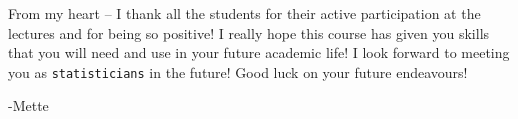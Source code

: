 \documentclass[ignorenonframetext,]{beamer}
\begin{document}
\begin{frame}[fragile]

From my heart -- I thank all the students for their active participation
at the lectures and for being so positive! I really hope this course has
given you skills that you will need and use in your future academic
life! I look forward to meeting you as \texttt{statisticians} in the
future! Good luck on your future endeavours!

-Mette

\end{frame}
\end{document}
